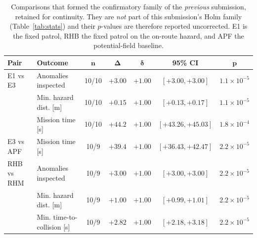 \begin{table}[t]
\centering
\caption{Comparisons that formed the confirmatory family of the \emph{previous}
submission, retained for continuity. They are \emph{not} part of this
submission's Holm family (Table~\ref{tab:stats}) and their $p$-values are
therefore reported uncorrected. E1 is the fixed patrol, RHB the fixed patrol on
the on-route hazard, and APF the potential-field baseline.}
\label{tab:legacystats}
\footnotesize
\setlength{\tabcolsep}{6pt}
\begin{tabular}{llccccc}
\hline
\textbf{Pair} & \textbf{Outcome} & $\bm{n}$ & $\bm{\Delta}$ & $\bm{\delta}$ &
\textbf{95\% CI} & $\bm{p}$\\
\hline
E1 vs E3    & Anomalies inspected         & 10/10 & $+3.00$ & $+1.00$ & $[+3.00,+3.00]$ & $1.1{\times}10^{-5}$\\
            & Min. hazard dist. [m]       & 10/10 & $+0.15$ & $+1.00$ & $[+0.13,+0.17]$ & $1.1{\times}10^{-5}$\\
            & Mission time [s]            & 10/10 & $+44.2$ & $+1.00$ & $[+43.26,+45.03]$ & $1.8{\times}10^{-4}$\\
E3 vs APF   & Mission time [s]            & 10/9 & $+39.4$ & $+1.00$ & $[+36.43,+42.47]$ & $2.2{\times}10^{-5}$\\
RHB vs RHM  & Anomalies inspected         & 10/9 & $+3.00$ & $+1.00$ & $[+3.00,+3.00]$ & $2.2{\times}10^{-5}$\\
            & Min. hazard dist. [m]       & 10/9 & $+1.00$ & $+1.00$ & $[+0.99,+1.01]$ & $2.2{\times}10^{-5}$\\
            & Min. time-to-collision [s]  & 10/9 & $+2.82$ & $+1.00$ & $[+2.18,+3.18]$ & $2.2{\times}10^{-5}$\\
\hline
\end{tabular}
\end{table}

